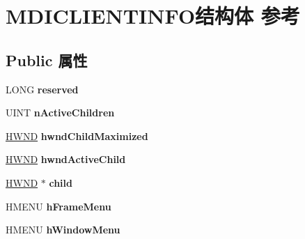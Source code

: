 \hypertarget{struct_m_d_i_c_l_i_e_n_t_i_n_f_o}{}\section{M\+D\+I\+C\+L\+I\+E\+N\+T\+I\+N\+F\+O结构体 参考}
\label{struct_m_d_i_c_l_i_e_n_t_i_n_f_o}
\subsection*{Public 属性}
\begin{DoxyCompactItemize}
\item 
\mbox{\label{struct_m_d_i_c_l_i_e_n_t_i_n_f_o_a3054a4f799efabb28e492391a406d8d6}} 
L\+O\+NG {\bfseries reserved}
\item 
\mbox{\label{struct_m_d_i_c_l_i_e_n_t_i_n_f_o_adad7b1263abcef59dbd6ee43c7a0ba97}} 
U\+I\+NT {\bfseries n\+Active\+Children}
\item 
\mbox{\label{struct_m_d_i_c_l_i_e_n_t_i_n_f_o_a506e6e58818b98ad3e20ee5eda72545a}} 
\hyperlink{interfacevoid}{H\+W\+ND} {\bfseries hwnd\+Child\+Maximized}
\item 
\mbox{\label{struct_m_d_i_c_l_i_e_n_t_i_n_f_o_a896729cc45f7002f945826df9654d0c4}} 
\hyperlink{interfacevoid}{H\+W\+ND} {\bfseries hwnd\+Active\+Child}
\item 
\mbox{\label{struct_m_d_i_c_l_i_e_n_t_i_n_f_o_ad32e091b871da456c1c95e0e576c6fea}} 
\hyperlink{interfacevoid}{H\+W\+ND} $\ast$ {\bfseries child}
\item 
\mbox{\label{struct_m_d_i_c_l_i_e_n_t_i_n_f_o_ab30abfb3a490b82b8d193e596403064b}} 
H\+M\+E\+NU {\bfseries h\+Frame\+Menu}
\item 
\mbox{\label{struct_m_d_i_c_l_i_e_n_t_i_n_f_o_a9bc7fa017dc9c7956c1aa946aad2944f}} 
H\+M\+E\+NU {\bfseries h\+Window\+Menu}
\item 
\mbox{\label{struct_m_d_i_c_l_i_e_n_t_i_n_f_o_a7d3a3b5579e8ee6c2bf256ecc2b81624}} 

\end{DoxyCompactItemize}
